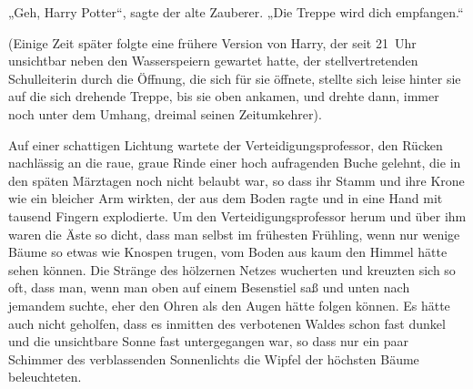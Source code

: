 „Geh, Harry Potter“, sagte der alte Zauberer. „Die Treppe wird dich empfangen.“

(Einige Zeit später folgte eine frühere Version von Harry, der seit 21~Uhr unsichtbar neben den Wasserspeiern gewartet hatte, der stellvertretenden Schulleiterin durch die Öffnung, die sich für sie öffnete, stellte sich leise hinter sie auf die sich drehende Treppe, bis sie oben ankamen, und drehte dann, immer noch unter dem Umhang, dreimal seinen Zeitumkehrer).


Auf einer schattigen Lichtung wartete der Verteidigungsprofessor, den Rücken nachlässig an die raue, graue Rinde einer hoch aufragenden Buche gelehnt, die in den späten Märztagen noch nicht belaubt war, so dass ihr Stamm und ihre Krone wie ein bleicher Arm wirkten, der aus dem Boden ragte und in eine Hand mit tausend Fingern explodierte. Um den Verteidigungsprofessor herum und über ihm waren die Äste so dicht, dass man selbst im frühesten Frühling, wenn nur wenige Bäume so etwas wie Knospen trugen, vom Boden aus kaum den Himmel hätte sehen können. Die Stränge des hölzernen Netzes wucherten und kreuzten sich so oft, dass man, wenn man oben auf einem Besenstiel saß und unten nach jemandem suchte, eher den Ohren als den Augen hätte folgen können. Es hätte auch nicht geholfen, dass es inmitten des verbotenen Waldes schon fast dunkel und die unsichtbare Sonne fast untergegangen war, so dass nur ein paar Schimmer des verblassenden Sonnenlichts die Wipfel der höchsten Bäume beleuchteten.

